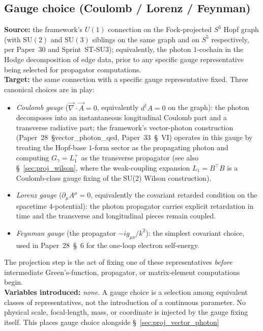 \documentclass[11pt]{article}
\begin{document}
\subsection{Gauge choice (Coulomb / Lorenz / Feynman)}
\label{sec:proj_gauge_choice}
\textbf{Source:} the framework's $U(1)$ connection on the Fock-projected
$S^3$ Hopf graph (with $\mathrm{SU}(2)$ and $\mathrm{SU}(3)$ siblings
on the same graph and on $S^5$ respectively, per Paper~30 and
Sprint~ST-SU3); equivalently, the photon $1$-cochain in the Hodge
decomposition of edge data, prior to any specific gauge representative
being selected for propagator computations.\\
\textbf{Target:} the same connection with a specific gauge
representative fixed.  Three canonical choices are in play:
\begin{itemize}\setlength{\itemsep}{2pt}
\item \emph{Coulomb gauge} ($\vec{\nabla} \cdot \vec{A} = 0$,
equivalently $d^\dagger A = 0$ on the graph): the photon decomposes
into an instantaneous longitudinal Coulomb part and a transverse
radiative part; the framework's vector-photon construction
(Paper~28~\S vector\_photon\_qed, Paper~33~\S~VI) operates in this
gauge by treating the Hopf-base $1$-form sector as the propagating
photon and computing $G_\gamma = L_1^+$ as the transverse propagator
(see also \S~\ref{sec:proj_wilson}, where the weak-coupling expansion
$L_1 = B^\top B$ is a Coulomb-class gauge fixing of the SU(2) Wilson
construction).
\item \emph{Lorenz gauge} ($\partial_\mu A^\mu = 0$, equivalently the
covariant retarded condition on the spacetime $4$-potential): the
photon propagator carries explicit retardation in time and the
transverse and longitudinal pieces remain coupled.
\item \emph{Feynman gauge} (the propagator $-i g_{\mu\nu}/k^2$): the
simplest covariant choice, used in Paper~28~\S~6 for the one-loop
electron self-energy.
\end{itemize}
The projection step is the act of fixing one of these representatives
\emph{before} intermediate Green's-function, propagator, or matrix-element
computations begin.\\
\textbf{Variables introduced:} \emph{none}.  A gauge choice is a
selection among equivalent classes of representatives, not the
introduction of a continuous parameter.  No physical scale,
focal-length, mass, or coordinate is injected by the gauge fixing
itself.  This places gauge choice alongside \S~\ref{sec:proj_vector_photon}
\end{document}
